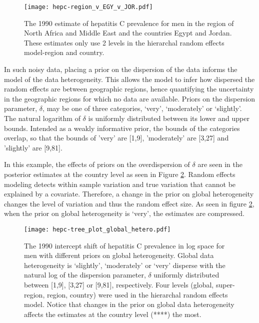     \begin{figure}[h]
        \begin{center}
            \texttt{[image: hepc-region\_v\_EGY\_v\_JOR.pdf]}
            \caption{The 1990 estimate of hepatitis C prevalence for men in the region of North Africa and Middle East and the countries Egypt and Jordan.  These estimates only use 2 levels in the hierarchal random effects model-region and country.}
            \label{fig:app-hepc regional rfx}
        \end{center}
    \end{figure}

In such noisy data, placing a prior on the dispersion of the data informs the model of the data heterogeneity.  This allows the model to infer how dispersed the random effects are between geographic regions, hence quantifying the uncertainty in the geographic regions for which no data are available.  Priors on the dispersion parameter, $\delta$, may be one of three categories, `very', `moderately' or `slightly'.  The natural logarithm of $\delta$ is uniformly distributed between its lower and upper bounds.  Intended as a weakly informative prior, the bounds of the categories overlap, so that the bounds of 'very' are [1,9], 'moderately' are [3,27] and 'slightly' are [9,81].

In this example, the effects of priors on the overdispersion of $\delta$ are seen in the posterior estimates at the country level as seen in Figure \ref{fig:app-hepc global hetero}.  Random effects modeling detects within sample variation and true variation that cannot be explained by a covariate.  Therefore, a change in the prior on global heterogeneity changes the level of variation and thus the random effect size.  As seen in figure \ref{fig:app-hepc global hetero}, when the prior on global heterogeneity is `very', the estimates are compressed.

    \begin{figure}[h]
        \begin{center}
            \texttt{[image: hepc-tree\_plot\_global\_hetero.pdf]}
            \caption{The 1990 intercept shift of hepatitis C prevalence in log space for men with different priors on global heterogeneity.  Global data heterogeneity is `slightly', `moderately' or `very' disperse with the natural log of the dispersion parameter, $\delta$ uniformly distributed between [1,9], [3,27] or [9,81], respectively.  Four levels (global, super-region, region, country) were used in the hierarchal random effects model.  Notice that changes in the prior on global data heterogeneity affects the estimates at the country level (****) the most.}
            \label{fig:app-hepc global hetero}
        \end{center}
    \end{figure}

